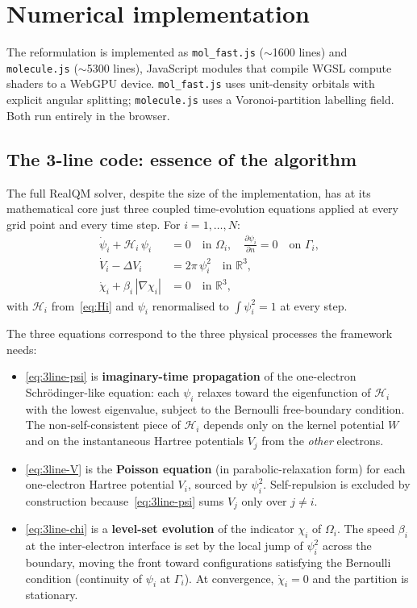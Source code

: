 \documentclass[11pt]{article}
\begin{document}
\section{Numerical implementation}\label{sec:implementation}

The reformulation is implemented as \texttt{mol\_fast.js} ($\sim$1600 lines) and \texttt{molecule.js} ($\sim$5300 lines), JavaScript modules that compile WGSL compute shaders to a WebGPU device. \texttt{mol\_fast.js} uses unit-density orbitals with explicit angular splitting; \texttt{molecule.js} uses a Voronoi-partition labelling field. Both run entirely in the browser.

\subsection{The 3-line code: essence of the algorithm}\label{sec:3line}

The full RealQM solver, despite the size of the implementation, has at its mathematical core just three coupled time-evolution equations applied at every grid point and every time step. For $i = 1, \ldots, N$:
\begin{align}
\dot{\psi}_i + \mathcal{H}_i\, \psi_i &= 0 \quad\text{in } \Omega_i, \quad \frac{\partial \psi_i}{\partial n} = 0 \quad\text{on } \Gamma_i, \label{eq:3line-psi} \\
\dot{V}_i - \Delta V_i &= 2\pi\, \psi_i^2 \quad\text{in } \mathbb{R}^3, \label{eq:3line-V} \\
\dot{\chi}_i + \beta_i\, |\nabla \chi_i| &= 0 \quad\text{in } \mathbb{R}^3, \label{eq:3line-chi}
\end{align}
with $\mathcal{H}_i$ from~\eqref{eq:Hi} and $\psi_i$ renormalised to $\int \psi_i^2 = 1$ at every step.

The three equations correspond to the three physical processes the framework needs:
\begin{itemize}\setlength{\itemsep}{2pt}
\item \eqref{eq:3line-psi} is \textbf{imaginary-time propagation} of the one-electron Schr\"odinger-like equation: each $\psi_i$ relaxes toward the eigenfunction of $\mathcal{H}_i$ with the lowest eigenvalue, subject to the Bernoulli free-boundary condition. The non-self-consistent piece of $\mathcal{H}_i$ depends only on the kernel potential $W$ and on the instantaneous Hartree potentials $V_j$ from the \emph{other} electrons.
\item \eqref{eq:3line-V} is the \textbf{Poisson equation} (in parabolic-relaxation form) for each one-electron Hartree potential $V_i$, sourced by $\psi_i^2$. Self-repulsion is excluded by construction because~\eqref{eq:3line-psi} sums $V_j$ only over $j \ne i$.
\item \eqref{eq:3line-chi} is a \textbf{level-set evolution} of the indicator $\chi_i$ of $\Omega_i$. The speed $\beta_i$ at the inter-electron interface is set by the local jump of $\psi_i^2$ across the boundary, moving the front toward configurations satisfying the Bernoulli condition (continuity of $\psi_i$ at $\Gamma_i$). At convergence, $\dot{\chi}_i = 0$ and the partition is stationary.
\end{itemize}
\end{document}
